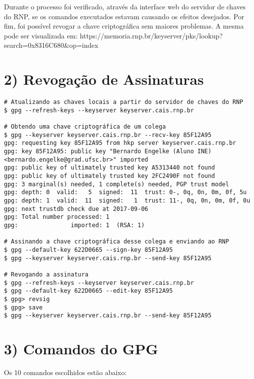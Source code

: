 \documentclass[a4paper,11pt]{article}
\theoremstyle{mytheor}
\begin{document}
Durante o processo foi verificado, através da interface web do servidor de chaves do RNP, se os comandos executados estavam causando os efeitos desejados. Por fim, foi possível revogar a chave criptográfica sem maiores problemas. A mesma pode ser visualizada em: https://memoria.rnp.br/keyserver/pks/lookup?search=0x8316C680&op=index

\section*{2) Revogação de Assinaturas}

\begin{lstlisting}
# Atualizando as chaves locais a partir do servidor de chaves do RNP
$ gpg --refresh-keys --keyserver keyserver.cais.rnp.br

# Obtendo uma chave criptográfica de um colega
$ gpg --keyserver keyserver.cais.rnp.br --recv-key 85F12A95
gpg: requesting key 85F12A95 from hkp server keyserver.cais.rnp.br
gpg: key 85F12A95: public key "Bernardo Engelke (Aluno INE) <bernardo.engelke@grad.ufsc.br>" imported
gpg: public key of ultimately trusted key A5313440 not found
gpg: public key of ultimately trusted key 2FC2490F not found
gpg: 3 marginal(s) needed, 1 complete(s) needed, PGP trust model
gpg: depth: 0  valid:   5  signed:  11  trust: 0-, 0q, 0n, 0m, 0f, 5u
gpg: depth: 1  valid:  11  signed:   1  trust: 11-, 0q, 0n, 0m, 0f, 0u
gpg: next trustdb check due at 2017-09-06
gpg: Total number processed: 1
gpg:               imported: 1  (RSA: 1)

# Assinando a chave criptográfica desse colega e enviando ao RNP
$ gpg --default-key 622D0665 --sign-key 85F12A95
$ gpg --keyserver keyserver.cais.rnp.br --send-key 85F12A95

# Revogando a assinatura
$ gpg --refresh-keys --keyserver keyserver.cais.rnp.br
$ gpg --default-key 622D0665 --edit-key 85F12A95
$ gpg> revsig
$ gpg> save
$ gpg --keyserver keyserver.cais.rnp.br --send-key 85F12A95

\end{lstlisting}

\section*{3) Comandos do GPG}

Os 10 comandos escolhidos estão abaixo:
\end{document}

